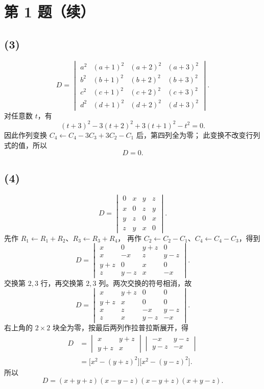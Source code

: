 \documentclass[11pt,a4paper,fontset=fandol]{ctexart}
\newcommand{\ans}[1]{\boxed{#1}}
\begin{document}
\newpage
\section*{第 1 题（续）}

\subsection*{(3)}
\[
D=\begin{vmatrix}
a^2&(a+1)^2&(a+2)^2&(a+3)^2\\
b^2&(b+1)^2&(b+2)^2&(b+3)^2\\
c^2&(c+1)^2&(c+2)^2&(c+3)^2\\
d^2&(d+1)^2&(d+2)^2&(d+3)^2
\end{vmatrix}.
\]
对任意数 $t$，有
\[
(t+3)^2-3(t+2)^2+3(t+1)^2-t^2=0.
\]
因此作列变换 $C_4\leftarrow C_4-3C_3+3C_2-C_1$ 后，第四列全为零；
此变换不改变行列式的值，所以
\[
\ans{D=0}.
\]

\subsection*{(4)}
\[
D=\begin{vmatrix}
0&x&y&z\\
x&0&z&y\\
y&z&0&x\\
z&y&x&0
\end{vmatrix}.
\]
先作 $R_1\leftarrow R_1+R_2$、$R_3\leftarrow R_3+R_4$，
再作 $C_2\leftarrow C_2-C_1$、$C_4\leftarrow C_4-C_3$，得到
\[
D=\begin{vmatrix}
x&0&y+z&0\\
x&-x&z&y-z\\
y+z&0&x&0\\
z&y-z&x&-x
\end{vmatrix}.
\]
交换第 $2,3$ 行，再交换第 $2,3$ 列。两次交换的符号相消，故
\[
D=\begin{vmatrix}
x&y+z&0&0\\
y+z&x&0&0\\
x&z&-x&y-z\\
z&x&y-z&-x
\end{vmatrix}.
\]
右上角的 $2\times2$ 块全为零，按最后两列作拉普拉斯展开，得
\begin{align*}
D&=\begin{vmatrix}x&y+z\\y+z&x\end{vmatrix}
   \begin{vmatrix}-x&y-z\\y-z&-x\end{vmatrix}\\
 &=\bigl[x^2-(y+z)^2\bigr]\bigl[x^2-(y-z)^2\bigr].
\end{align*}
所以
\[
\ans{D=(x+y+z)(x-y-z)(x-y+z)(x+y-z)}.
\]
\end{document}
